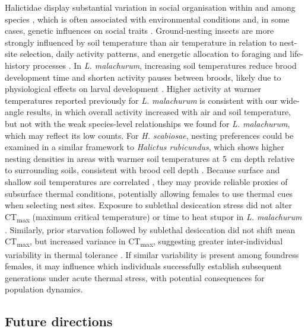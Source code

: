 \documentclass[11pt,a4paper]{article}
\begin{document}
Halictidae display substantial variation in social organisation within and among species \citep{Hirata2005, Packer1998, Plateaux1993, Richards2003, Yanega1988}, which is often associated with environmental conditions \citep{Yanega1997, Eickwort1996, Miyanaga1999} and, in some cases, genetic influences on social traits \citep{Danforth2003, Plateaux2000, Soucy2002}. Ground-nesting insects are more strongly influenced by soil temperature than air temperature in relation to nest-site selection, daily activity patterns, and energetic allocation to foraging and life-history processes \citep{Cameron1996, Crist1999, Potts1997, Strohm1998, Vogt2003, Weissel2006}. In \textit{L. malachurum}, increasing soil temperatures reduce brood development time and shorten activity pauses between broods, likely due to physiological effects on larval development \citep{Weissel2006}. Higher activity at warmer temperatures reported previously for \textit{L. malachurum} \citep{Weissel2006} is consistent with our wide-angle results, in which overall activity increased with air and soil temperature, but not with the weak species-level relationships we found for \textit{L. malachurum}, which may reflect its low counts. For \textit{H. scabiosae}, nesting preferences could be examined in a similar framework to \textit{Halictus rubicundus}, which shows higher nesting densities in areas with warmer soil temperatures at 5~cm depth relative to surrounding soils, consistent with brood cell depth \citep{Potts1997}. Because surface and shallow soil temperatures are correlated \citep{West1952, Xu1997, Rajver2006}, they may provide reliable proxies of subsurface thermal conditions, potentially allowing females to use thermal cues when selecting nest sites. Exposure to sublethal desiccation stress did not alter CT\textsubscript{max} (maximum critical temperature) or time to heat stupor in \textit{L. malachurum} \citep{Gonzalez2024a}. Similarly, prior starvation followed by sublethal desiccation did not shift mean CT\textsubscript{max}, but increased variance in CT\textsubscript{max}, suggesting greater inter-individual variability in thermal tolerance \citep{Gonzalez2024a}. If similar variability is present among foundress females, it may influence which individuals successfully establish subsequent generations under acute thermal stress, with potential consequences for population dynamics.

\subsection{Future directions}
\end{document}
